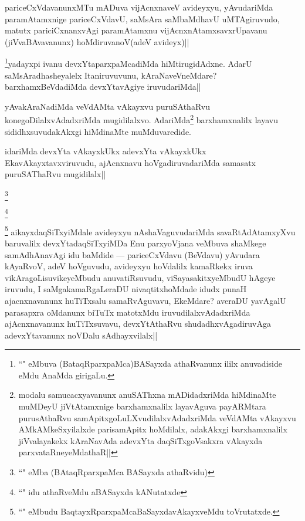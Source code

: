 
\begin{artha}
pariceCxVdavanunxMTu mADuva vijAcnxnaveV avideyxyu, yAvudariMda paramAtamxnige 
pariceCxVdavU, saMsAra saMbaMdhavU uMTAgiruvudo, matutx pariciCxnanxvAgi paramAtamxnu 
vijAcnxnAtamxsavxrUpavanu (jiVvaBAvavanunx) hoMdiruvanoV(adeV avideyx)||
\end{artha}

\begin{artha}
\footnote{``\stext" eMbuva (BataqRparxpaMca)BASayxda athaRvanunx ililx anuvadiside eMdu AnaMda girigaLu.}yadayxpi ivanu devxYtaparxpaMcadiMda hiMtirugidAdxne. AdarU saMsAradhasheyalelx Itaniruvuvunu, kAraNaveVneMdare? barxhamxBeVdadiMda devxYtavAgiye iruvudariMda||
\end{artha}

\begin{artha}
yAvakAraNadiMda veVdAMta vAkayxvu puruSAthaRvu konegoDilalxvAdadxriMda mugidilalxvo. AdariMda\footnote{modalu samucacxyavanunx anuSAThxna mADidadxriMda hiMdinaMte muMDeyU jiVtAtamxnige barxhamxnalilx layavAguva payARMtara purusAthaRvu samApitxgoLuLXvudilalxvAdadxriMda veVdAMta vAkayxvu AMkAMkeSxyilalxde parisamApitx hoMdilalx, adakAkxgi barxhamxnalilx jiVvalayakekx kAraNavAda adevxYta daqSiTxgoVsakxra vAkayxda parxvataRneyeMdathaR||} barxhamxnalilx layavu sididhxsuvudakAkxgi hiMdinaMte muMduvaredide.
\end{artha}

\begin{artha}
idariMda devxYta vAkayxkUkx adevxYta vAkayxkUkx EkavAkayxtavxviruvudu, ajAcnxnavu hoVgadiruvadariMda samasatx puruSAThaRvu mugidilalx|| 
\end{artha}

\begin{artha}
\footnote{``\stext" eMba (BAtaqRparxpaMca BASayxda athaRvidu)}
\end{artha}

\begin{artha}
\footnote{``\stext" idu athaRveMdu aBASayxda kANutatxde }
\end{artha}

\begin{artha}
\footnote{``\stext" eMbudu BaqtayxRparxpaMcaBaSayxdavAkayxveMdu toVrutatxde.} aikayxdaqSiTxyiMdale avideyxyu nAshaVaguvudariMda savaRtAdAtamxyXvu baruvalilx devxYtadaqSiTxyiMDa Enu parxyoVjana veMbuva shaMkege samAdhAnavAgi idu baMdide --- pariceCxVdavu (BeVdavu) yAvudara kAyaRvoV, adeV hoVguvudu, avideyxyu hoVdalilx kamaRkekx iruva vikAragoLisuvikeyeMbudu anuvatiRsuvudu, viSayasakitxyeMbudU hAgeye iruvudu, I saMgakamaRgaLeraDU nivaqtitxhoMdade idudx punaH ajacnxnavanunx huTiTxsalu samaRvAguvavu, EkeMdare? averaDU yavAgalU parasapxra oMdanunx biTuTx matotxMdu iruvudilalxvAdadxriMda ajAcnxnavanunx huTiTxsuvavu, devxYtAthaRvu shudadhxvAgadiruvAga adevxYtavanunx noVDalu sAdhayxvilalx||
\end{artha}

